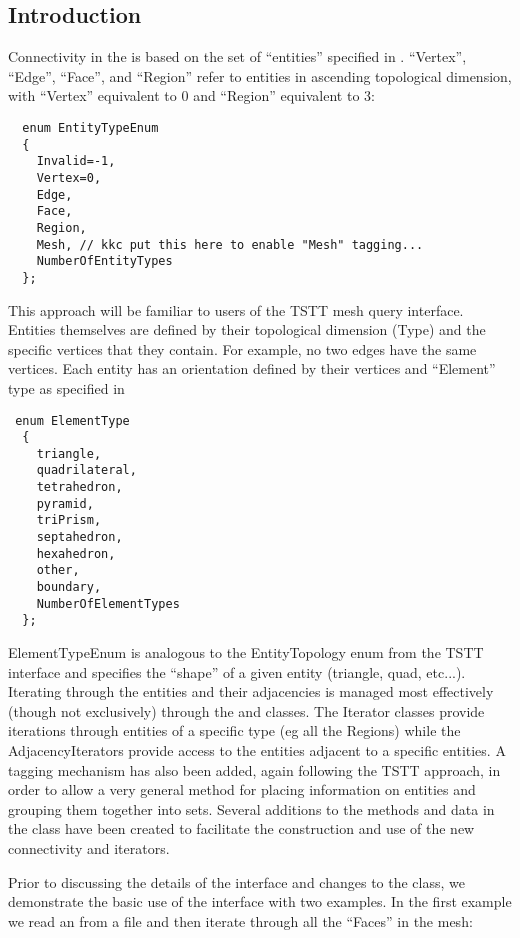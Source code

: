 

\subsection{Introduction}
Connectivity in the \umap is based on the set of
``entities'' specified in .
``Vertex'', ``Edge'', ``Face'', and ``Region'' refer to entities in
ascending topological dimension, with ``Vertex'' equivalent to 0 and
``Region'' equivalent to 3:

\begin{verbatim}
  enum EntityTypeEnum
  {
    Invalid=-1,
    Vertex=0,
    Edge,
    Face,
    Region,
    Mesh, // kkc put this here to enable "Mesh" tagging...
    NumberOfEntityTypes
  };
\end{verbatim}

  This approach will be familiar to users of the TSTT mesh query
interface.  Entities themselves are defined by their topological
dimension (Type) and the specific vertices that they contain.  For
example, no two edges have the same vertices.  Each entity has an
orientation defined by their vertices and ``Element'' type as
specified in 
\begin{verbatim}
 enum ElementType 
  {
    triangle,
    quadrilateral,
    tetrahedron,
    pyramid,
    triPrism,
    septahedron,  
    hexahedron,
    other,
    boundary,
    NumberOfElementTypes
  };
\end{verbatim}
  ElementTypeEnum is analogous to the EntityTopology enum from the TSTT
interface and specifies the ``shape'' of a given entity (triangle,
quad, etc...).  Iterating through the entities and their adjacencies
is managed most effectively (though not exclusively) through the
\umapI and \umapAI
classes. The Iterator classes provide iterations through entities of a
specific type (eg all the Regions) while the AdjacencyIterators
provide access to the entities adjacent to a specific entities.  A
tagging mechanism has also been added, again following the TSTT
approach, in order to allow a very general method for placing
information on entities and grouping them together into sets.  Several
additions to the methods and data in the \umap class
have been created to facilitate the construction and use of the new
connectivity and iterators.


Prior to discussing the details of the interface and changes to the
\umap class, we demonstrate the basic use of
the interface with two examples.  In the first example we
read an \umap from a file and then iterate through all the ``Faces''
in the mesh:

